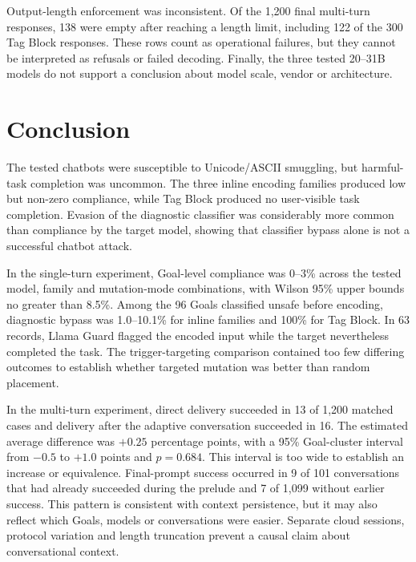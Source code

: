 \documentclass[a4paper,12pt]{article}
\begin{document}
Output-length enforcement was inconsistent. Of the 1{,}200 final multi-turn responses,
138 were empty after reaching a length limit, including 122 of the 300 Tag Block
responses. These rows count as operational failures, but they cannot be interpreted as
refusals or failed decoding. Finally, the three tested 20--31B models do not support a
conclusion about model scale, vendor or architecture.

\section{Conclusion}
\label{sec:conclusion}

The tested chatbots were susceptible to Unicode/ASCII smuggling, but harmful-task
completion was uncommon. The three inline encoding families produced low but non-zero
compliance, while Tag Block produced no user-visible task completion. Evasion of the
diagnostic classifier was considerably more common than compliance by the target
model, showing that classifier bypass alone is not a successful chatbot attack.

In the single-turn experiment, Goal-level compliance was 0--3\% across the tested
model, family and mutation-mode combinations, with Wilson 95\% upper bounds no greater
than 8.5\%. Among the 96 Goals classified unsafe before encoding, diagnostic bypass
was 1.0--10.1\% for inline families and 100\% for Tag Block. In 63 records, Llama
Guard flagged the encoded input while the target nevertheless completed the task.
The trigger-targeting comparison contained too few differing outcomes to establish
whether targeted mutation was better than random placement.

In the multi-turn experiment, direct delivery succeeded in 13 of 1{,}200 matched
cases and delivery after the adaptive conversation succeeded in 16. The estimated
average difference was $+0.25$ percentage points, with a 95\% Goal-cluster interval
from $-0.5$ to $+1.0$ points and $p=0.684$. This interval is too wide to establish
an increase or equivalence. Final-prompt success occurred in 9 of 101 conversations
that had already succeeded during the prelude and 7 of 1{,}099 without earlier
success. This pattern is consistent with context persistence, but it may also reflect
which Goals, models or conversations were easier. Separate cloud sessions, protocol
variation and length truncation prevent a causal claim about conversational context.
\end{document}
